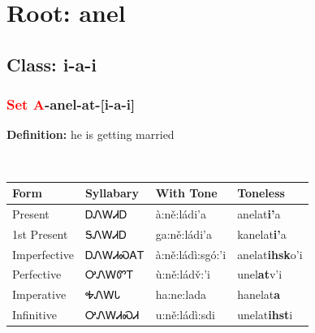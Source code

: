 \needspace{4in}
\section*{Root: anel}
\nopagebreak
{}
\needspace{3in}
\subsection*{Class: i-a-i}
\nopagebreak
\needspace{2in}
\subsubsection*{\textcolor{Red}{Set A}{-}\textbf{anel}{-}at{-}[i-a-i]}
\nopagebreak
\textbf{Definition: } he is getting married
\\[0.5em]
\begin{tabularx}{\textwidth}{l X X X}%
\toprule%
\textbf{Form}&\textbf{Syllabary}&\textbf{With Tone}&\textbf{Toneless}\\%
\midrule%
Present&ᎠᏁᎳᏗᎠ&à:ně:ládi’a&anelat\textbf{i'}a\\%
1st Present&ᎦᏁᎳᏗᎠ&ga:ně:ládi’a&kanelat\textbf{i'}a\\%
Imperfective&ᎠᏁᎳᏗᏍᎪᎢ&à:ně:ládì:sgó:’i&anelat\textbf{ihsk}o'i\\%
Perfective&ᎤᏁᎳᏛᎢ&ù:ně:ládv̌:’i&unel\textbf{at}v'i\\%
Imperative&ᎭᏁᎳᏓ&ha:ne:lada&hanelat\textbf{a}\\%
Infinitive&ᎤᏁᎳᏗᏍᏗ&u:ně:ládì:sdi&unelat\textbf{ihst}i\\%
\bottomrule%
\end{tabularx}
\\[1em]